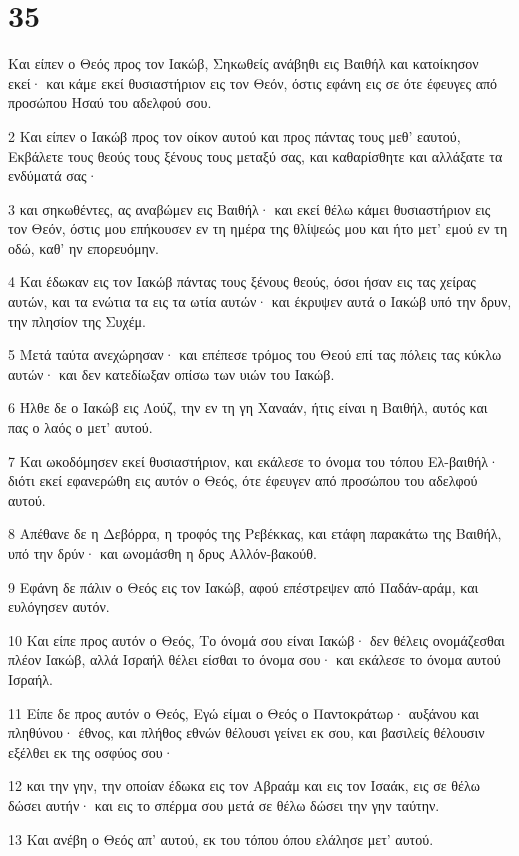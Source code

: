 \chapter{35}

\par Και είπεν ο Θεός προς τον Ιακώβ, Σηκωθείς ανάβηθι εις Βαιθήλ και κατοίκησον εκεί· και κάμε εκεί θυσιαστήριον εις τον Θεόν, όστις εφάνη εις σε ότε έφευγες από προσώπου Ησαύ του αδελφού σου.
\par 2 Και είπεν ο Ιακώβ προς τον οίκον αυτού και προς πάντας τους μεθ' εαυτού, Εκβάλετε τους θεούς τους ξένους τους μεταξύ σας, και καθαρίσθητε και αλλάξατε τα ενδύματά σας·
\par 3 και σηκωθέντες, ας αναβώμεν εις Βαιθήλ· και εκεί θέλω κάμει θυσιαστήριον εις τον Θεόν, όστις μου επήκουσεν εν τη ημέρα της θλίψεώς μου και ήτο μετ' εμού εν τη οδώ, καθ' ην επορευόμην.
\par 4 Και έδωκαν εις τον Ιακώβ πάντας τους ξένους θεούς, όσοι ήσαν εις τας χείρας αυτών, και τα ενώτια τα εις τα ωτία αυτών· και έκρυψεν αυτά ο Ιακώβ υπό την δρυν, την πλησίον της Συχέμ.
\par 5 Μετά ταύτα ανεχώρησαν· και επέπεσε τρόμος του Θεού επί τας πόλεις τας κύκλω αυτών· και δεν κατεδίωξαν οπίσω των υιών του Ιακώβ.
\par 6 Ήλθε δε ο Ιακώβ εις Λούζ, την εν τη γη Χαναάν, ήτις είναι η Βαιθήλ, αυτός και πας ο λαός ο μετ' αυτού.
\par 7 Και ωκοδόμησεν εκεί θυσιαστήριον, και εκάλεσε το όνομα του τόπου Ελ-βαιθήλ· διότι εκεί εφανερώθη εις αυτόν ο Θεός, ότε έφευγεν από προσώπου του αδελφού αυτού.
\par 8 Απέθανε δε η Δεβόρρα, η τροφός της Ρεβέκκας, και ετάφη παρακάτω της Βαιθήλ, υπό την δρύν· και ωνομάσθη η δρυς Αλλόν-βακούθ.
\par 9 Εφάνη δε πάλιν ο Θεός εις τον Ιακώβ, αφού επέστρεψεν από Παδάν-αράμ, και ευλόγησεν αυτόν.
\par 10 Και είπε προς αυτόν ο Θεός, Το όνομά σου είναι Ιακώβ· δεν θέλεις ονομάζεσθαι πλέον Ιακώβ, αλλά Ισραήλ θέλει είσθαι το όνομα σου· και εκάλεσε το όνομα αυτού Ισραήλ.
\par 11 Είπε δε προς αυτόν ο Θεός, Εγώ είμαι ο Θεός ο Παντοκράτωρ· αυξάνου και πληθύνου· έθνος, και πλήθος εθνών θέλουσι γείνει εκ σου, και βασιλείς θέλουσιν εξέλθει εκ της οσφύος σου·
\par 12 και την γην, την οποίαν έδωκα εις τον Αβραάμ και εις τον Ισαάκ, εις σε θέλω δώσει αυτήν· και εις το σπέρμα σου μετά σε θέλω δώσει την γην ταύτην.
\par 13 Και ανέβη ο Θεός απ' αυτού, εκ του τόπου όπου ελάλησε μετ' αυτού.
